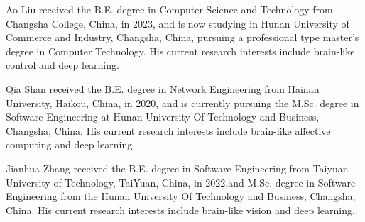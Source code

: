 \documentclass[lettersize,journal]{IEEEtran}
\begin{document}
\begin{IEEEbiography}
	{Ao Liu}
	received the B.E. degree in Computer Science and Technology from Changsha College, China, in 2023, and is now studying in Hunan University of Commerce and Industry, Changsha, China, pursuing a professional type master's degree in Computer Technology. His current research interests include brain-like control and deep learning.
\end{IEEEbiography}

\begin{IEEEbiography}
	{Qia Shan}
	received the B.E. degree in Network Engineering from Hainan University, Haikou, China, in 2020, and is currently pursuing the M.Sc. degree in Software Engineering at Hunan University Of Technology and Business, Changsha, China. His current research interests include brain-like affective computing and deep learning.
\end{IEEEbiography}

\begin{IEEEbiography}
	{Jianhua Zhang}
	received the B.E. degree in Software Engineering from Taiyuan University of Technology, TaiYuan, China, in 2022,and M.Sc. degree in Software Engineering from the Hunan University Of Technology and Business, Changsha, China. His current research interests include brain-like vision and deep learning.
\end{IEEEbiography}
\end{document}
